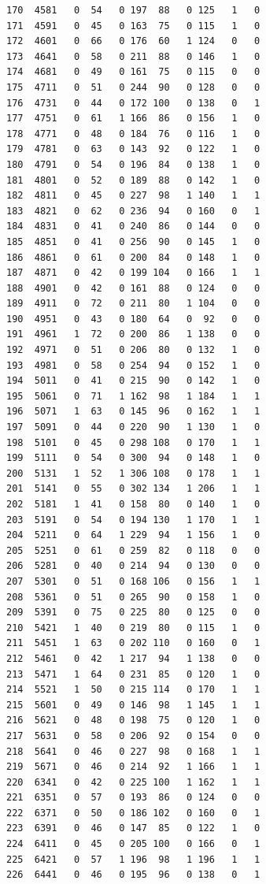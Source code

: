 \documentclass[
  letterpaper,
  DIV=11,
  numbers=noendperiod]{scrreprt}
\begin{document}
\begin{verbatim}
170  4581   0  54   0 197  88   0 125   1   0
171  4591   0  45   0 163  75   0 115   1   0
172  4601   0  66   0 176  60   1 124   0   0
173  4641   0  58   0 211  88   0 146   1   0
174  4681   0  49   0 161  75   0 115   0   0
175  4711   0  51   0 244  90   0 128   0   0
176  4731   0  44   0 172 100   0 138   0   1
177  4751   0  61   1 166  86   0 156   1   0
178  4771   0  48   0 184  76   0 116   1   0
179  4781   0  63   0 143  92   0 122   1   0
180  4791   0  54   0 196  84   0 138   1   0
181  4801   0  52   0 189  88   0 142   1   0
182  4811   0  45   0 227  98   1 140   1   1
183  4821   0  62   0 236  94   0 160   0   1
184  4831   0  41   0 240  86   0 144   0   0
185  4851   0  41   0 256  90   0 145   1   0
186  4861   0  61   0 200  84   0 148   1   0
187  4871   0  42   0 199 104   0 166   1   1
188  4901   0  42   0 161  88   0 124   0   0
189  4911   0  72   0 211  80   1 104   0   0
190  4951   0  43   0 180  64   0  92   0   0
191  4961   1  72   0 200  86   1 138   0   0
192  4971   0  51   0 206  80   0 132   1   0
193  4981   0  58   0 254  94   0 152   1   0
194  5011   0  41   0 215  90   0 142   1   0
195  5061   0  71   1 162  98   1 184   1   1
196  5071   1  63   0 145  96   0 162   1   1
197  5091   0  44   0 220  90   1 130   1   0
198  5101   0  45   0 298 108   0 170   1   1
199  5111   0  54   0 300  94   0 148   1   0
200  5131   1  52   1 306 108   0 178   1   1
201  5141   0  55   0 302 134   1 206   1   1
202  5181   1  41   0 158  80   0 140   1   0
203  5191   0  54   0 194 130   1 170   1   1
204  5211   0  64   1 229  94   1 156   1   0
205  5251   0  61   0 259  82   0 118   0   0
206  5281   0  40   0 214  94   0 130   0   0
207  5301   0  51   0 168 106   0 156   1   1
208  5361   0  51   0 265  90   0 158   1   0
209  5391   0  75   0 225  80   0 125   0   0
210  5421   1  40   0 219  80   0 115   1   0
211  5451   1  63   0 202 110   0 160   0   1
212  5461   0  42   1 217  94   1 138   0   0
213  5471   1  64   0 231  85   0 120   1   0
214  5521   1  50   0 215 114   0 170   1   1
215  5601   0  49   0 146  98   1 145   1   1
216  5621   0  48   0 198  75   0 120   1   0
217  5631   0  58   0 206  92   0 154   0   0
218  5641   0  46   0 227  98   0 168   1   1
219  5671   0  46   0 214  92   1 166   1   1
220  6341   0  42   0 225 100   1 162   1   1
221  6351   0  57   0 193  86   0 124   0   0
222  6371   0  50   0 186 102   0 160   0   1
223  6391   0  46   0 147  85   0 122   1   0
224  6411   0  45   0 205 100   0 166   0   1
225  6421   0  57   1 196  98   1 196   1   1
226  6441   0  46   0 195  96   0 138   0   1

\end{verbatim}
\end{document}
